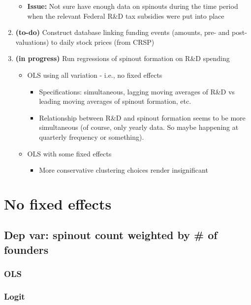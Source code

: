 \documentclass[12pt,english]{article}
\theoremstyle{remark}
\begin{document}
\begin{enumerate}
\begin{itemize}
		\item \textbf{Issue: } Not sure have enough data on spinouts during the time period when the relevant Federal R\&D tax subsidies were put into place
	\end{itemize}
	\item \textbf{(to-do)} Construct database linking funding events (amounts, pre- and post- valuations) to daily stock prices (from CRSP)
	\item \textbf{(in progress)} Run regressions of spinout formation on R\&D spending
	\begin{itemize}
		\item OLS using all variation - i.e., no fixed effects
		\begin{itemize}
			\item Specifications: simultaneous, lagging moving averages of R\&D vs leading moving averages of spinout formation, etc.
			\item Relationship between R\&D and spinout formation seems to be more simultaneous (of course, only yearly data. So maybe happening at quarterly frequency or something).
		\end{itemize}
		\item OLS with some fixed effects
		\begin{itemize}
			\item More conservative clustering choices render insignificant
		\end{itemize}
	\end{itemize}
\end{enumerate}


\section{No fixed effects}

\subsection{Dep var: spinout count weighted by \# of founders}

\subsubsection{OLS}


\subsubsection{Logit}

\linebreak

\linebreak

\end{document}
